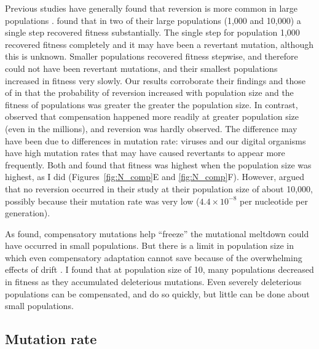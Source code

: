 \begin{doublespace}
Previous studies have generally found that reversion is more common
in large populations \citep{bur99,arg07}.
%
\citet{bur99} found that in two of their large populations
(1,000 and 10,000) a single step recovered fitness substantially.
%
The single step for population 1,000 recovered fitness completely
and it may have been a revertant mutation, although this is unknown.
%
Smaller populations recovered fitness stepwise, and therefore
could not have been revertant mutations,
and their smallest populations increased in fitness very slowly.
%
Our results corroborate their findings and
those of \citet{san05} in that
the probability of reversion increased with population size
and the fitness of populations was greater the greater the population size.
%
In contrast, \citet{mai02} observed that
compensation happened more readily at greater population size
(even in the millions), and reversion was hardly observed.
%
The difference may have been due to differences in mutation rate:
viruses and our digital organisms have high mutation rates
that may have caused revertants to appear more frequently.
%
Both \citet{bur99} and \citet{mai02}
found that fitness was highest when the population size was highest,
as I did (Figures~\ref{fig:N_comp}E and \ref{fig:N_comp}F).
%
However, \citet{est03} argued that no reversion occurred in their
study at their population size of about 10,000, possibly because their mutation
rate was very low ($4.4 \times 10^{-8}$ per nucleotide per generation).



As \citet{poo00} found, compensatory mutations help ``freeze''
the mutational meltdown could have occurred in small populations.
%
But there is a limit in population size in which even compensatory adaptation
cannot save because of the overwhelming effects of drift \citep{poo05}.
%
I found that at population size of 10, many populations decreased in fitness
as they accumulated deleterious mutations.
%
Even severely deleterious populations can be compensated, and do so quickly,
but little can be done about small populations.



\subsection{Mutation rate}


\end{doublespace}
